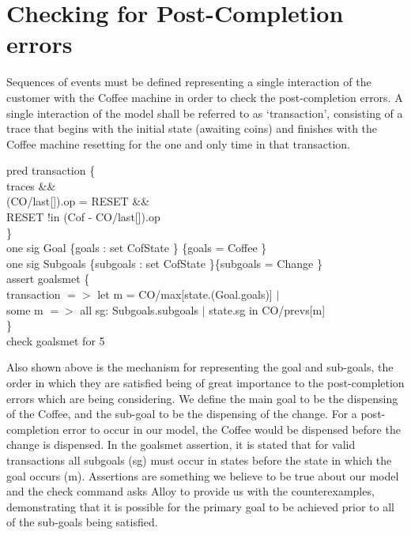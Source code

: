\documentclass[a4paper,12pt]{extarticle}
\begin{document}
\section{Checking for Post-Completion errors}
\label{Post completion error check}
Sequences of events must be defined representing a single interaction of the customer with the Coffee machine in order to check the post-completion errors. A single interaction of the model shall be referred to as `transaction’, consisting of a trace that begins with the initial state (awaiting coins) and finishes with the Coffee machine resetting for the one and only time in that transaction.
\begin{algorithm}
pred transaction \{\\

traces \&\& \\
(CO/last[]).op = RESET \&\& \\
RESET !in (Cof - CO/last[]).op\\

\}\\

one sig Goal \{goals : set CofState \} \{goals = Coffee \}\\
one sig Subgoals \{subgoals : set CofState \}\{subgoals = Change \}\\

assert goalsmet \{ \\

transaction $=>$ let m = CO/max[state.(Goal.goals)] $|$ \\
some m $=>$ all sg: Subgoals.subgoals $|$ state.sg in CO/prevs[m]\\

\}\\

check goalsmet for 5\\
\end{algorithm}
Also shown above is the mechanism for representing the goal and sub-goals, the order in which they are satisfied being of great importance to the post-completion errors which are being considering. We define the main goal to be the dispensing of the Coffee, and the sub-goal to be the dispensing of the change. For a post-completion error to occur in our model, the Coffee would be dispensed before the change is dispensed. In the goalsmet assertion, it is stated that for valid transactions all subgoals (sg) must occur in states before the state in which the goal occurs (m). Assertions are something we believe to be true about our model and the check command asks Alloy to provide us with the counterexamples, demonstrating that it is possible for the primary goal to be achieved prior to all of the sub-goals being satisfied.\\
\end{document}
